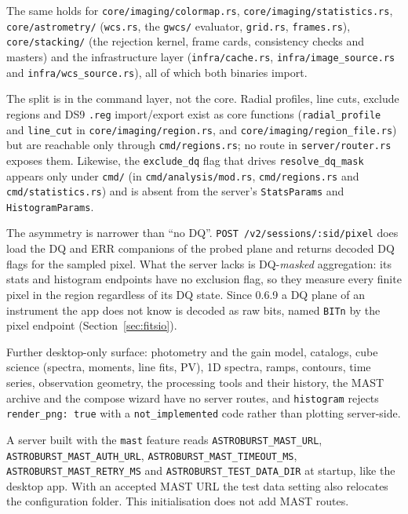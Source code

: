 \documentclass[11pt,a4paper]{article}
\newcommand{\code}[1]{\texttt{\small #1}}
\begin{document}
    The same holds for \code{core/imaging/colormap.rs}, \code{core/imaging/statistics.rs}, \code{core/astrometry/} (\code{wcs.rs}, the \code{gwcs/} evaluator, \code{grid.rs}, \code{frames.rs}), \code{core/stacking/} (the rejection kernel, frame cards, consistency checks and masters) and the infrastructure layer (\code{infra/cache.rs}, \code{infra/image\_source.rs} and \code{infra/wcs\_source.rs}), all of which both binaries import.

    The split is in the command layer, not the core. Radial profiles, line cuts, exclude regions and DS9 \code{.reg} import/export exist as core functions (\code{radial\_profile} and \code{line\_cut} in \code{core/imaging/region.rs}, and \code{core/imaging/region\_file.rs}) but are reachable only through \code{cmd/regions.rs}; no route in \code{server/router.rs} exposes them. Likewise, the \code{exclude\_dq} flag that drives \code{resolve\_dq\_mask} appears only under \code{cmd/} (in \code{cmd/analysis/mod.rs}, \code{cmd/regions.rs} and \code{cmd/statistics.rs}) and is absent from the server's \code{StatsParams} and \code{HistogramParams}.

    \begin{notebox}
        The asymmetry is narrower than ``no DQ''. \code{POST /v2/sessions/:sid/pixel} does load the DQ and ERR companions of the probed plane and returns decoded DQ flags for the sampled pixel. What the server lacks is DQ-\emph{masked} aggregation: its stats and histogram endpoints have no exclusion flag, so they measure every finite pixel in the region regardless of its DQ state. Since 0.6.9 a DQ plane of an instrument the app does not know is decoded as raw bits, named \code{BITn} by the pixel endpoint (Section~\ref{sec:fitsio}).
    \end{notebox}

    Further desktop-only surface: photometry and the gain model, catalogs, cube science (spectra, moments, line fits, PV), 1D spectra, ramps, contours, time series, observation geometry, the processing tools and their history, the MAST archive and the compose wizard have no server routes, and \code{histogram} rejects \code{render\_png: true} with a \code{not\_implemented} code rather than plotting server-side.

    A server built with the \code{mast} feature reads \code{ASTROBURST\_MAST\_URL}, \code{ASTROBURST\_MAST\_AUTH\_URL}, \code{ASTROBURST\_MAST\_TIMEOUT\_MS}, \code{ASTROBURST\_MAST\_RETRY\_MS} and \code{ASTROBURST\_TEST\_DATA\_DIR} at startup, like the desktop app. With an accepted MAST URL the test data setting also relocates the configuration folder. This initialisation does not add MAST routes.
\end{document}
